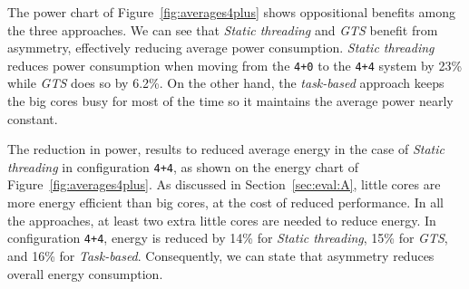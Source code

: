The power chart of Figure~\ref{fig:averages4plus} shows oppositional benefits among the three approaches. We can see that \emph{Static threading} and \emph{GTS} benefit from asymmetry, effectively reducing average power consumption.
\emph{Static threading} reduces power consumption when moving from the \texttt{4+0} to the \texttt{4+4} system by 23\% while \emph{GTS} does so by 6.2\%.
On the other hand, the \emph{task-based} approach keeps the big cores busy for most of the time so it maintains the average power nearly constant.






The reduction in power, results to reduced average energy in the case of 
\emph{Static threading} in configuration \texttt{4+4}, as shown on the energy chart of 
Figure~\ref{fig:averages4plus}. As discussed in Section~\ref{sec:eval:A}, little cores are more energy 
efficient than big cores, at the cost of reduced performance. In all the approaches, at least two 
extra little cores are needed to reduce energy. In configuration \texttt{4+4}, energy is reduced by 
14\% for \emph{Static threading}, 15\% for \emph{GTS}, and 16\% for \emph{Task-based}. Consequently, we can state that asymmetry reduces overall energy consumption.

